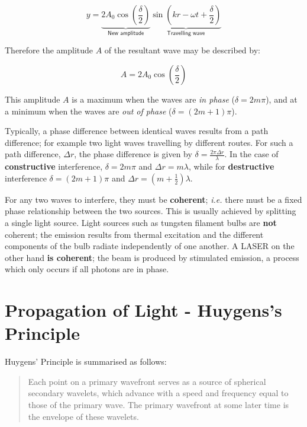 \documentclass[
]{book}
\begin{document}
\begin{equation}
y = \underbrace{2 A_0 \cos \left( \frac{\delta}{2} \right)}_{\textsf{New amplitude}} \underbrace{\sin \left( kr - \omega t + \frac{\delta}{2} \right)}_{\textsf{Travelling wave}}
\end{equation}

Therefore the amplitude \(A\) of the resultant wave may be described by:

\begin{equation}
A = 2 A_0 \cos \left( \frac{\delta}{2} \right)
\label{eq:ch13-amplitudeinterfere1}
\end{equation}

This amplitude \(A\) is a maximum when the waves are \emph{in phase} (\(\delta = 2m\pi\)), and at a minimum when the waves are \emph{out of phase} (\(\delta = (2m+1)\pi\)).

Typically, a phase difference between identical waves results from a path difference; for example two light waves travelling by different routes. For such a path difference, \(\Delta r\), the phase difference is given by \(\delta = \frac{2 \pi \Delta r}{\lambda}\). In the case of \textbf{constructive} interference, \(\delta = 2m\pi\) and \(\Delta r = m\lambda\), while for \textbf{destructive} interference \(\delta = (2m+1)\pi\) and \(\Delta r = \left(m+\frac{1}{2}\right)\lambda\).

For any two waves to interfere, they must be \textbf{coherent}; \emph{i.e.} there must be a fixed phase relationship between the two sources. This is usually achieved by splitting a single light source. Light sources such as tungsten filament bulbs are \textbf{not} coherent; the emission results from thermal excitation and the different components of the bulb radiate independently of one another. A LASER on the other hand \textbf{is coherent}; the beam is produced by stimulated emission, a process which only occurs if all photons are in phase.

\hypertarget{sec:ch13-lightpropagation}{%
\section{Propagation of Light - Huygens's Principle}\label{sec:ch13-lightpropagation}}

Huygens' Principle is summarised as follows:

\begin{quote}
Each point on a primary wavefront serves as a source of spherical secondary wavelets, which advance with a speed and frequency equal to those of the primary wave. The primary wavefront at some later time is the envelope of these wavelets.
\end{quote}
\end{document}
